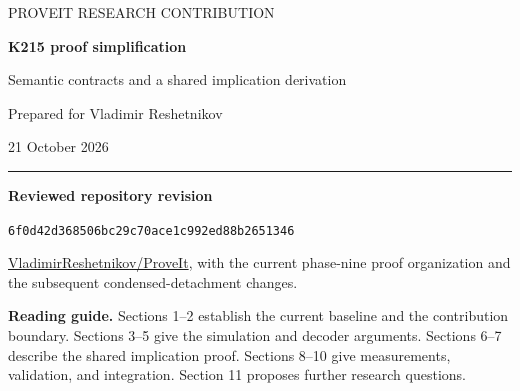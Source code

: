 \documentclass[11pt,letterpaper]{article}
\theoremstyle{definition}\newtheorem{definition}[theorem]{Definition}
\theoremstyle{remark}\newtheorem{remark}[theorem]{Remark}
\newcommand{\Baseline}{\texttt{6f0d42d368506bc29c70ace1c992ed88b2651346}}
\newcommand{\RepoURL}{https://github.com/VladimirReshetnikov/ProveIt}
\begin{document}
\begin{titlepage}
{\sffamily\small\color{ink} PROVEIT RESEARCH CONTRIBUTION\par}
\vspace{0.8in}
{\sffamily\bfseries\LARGE\color{ink} K215 proof simplification\par}
\vspace{0.15in}
{\sffamily\Large Semantic contracts and a shared implication derivation\par}
\vspace{0.35in}
{\large Prepared for Vladimir Reshetnikov\par}
{21 October 2026\par}
\vspace{0.3in}\hrule\vspace{0.2in}
\textbf{Reviewed repository revision}\par
\Baseline\par
\smallskip
\href{\RepoURL}{VladimirReshetnikov/ProveIt}, with the current phase-nine proof organization and the subsequent condensed-detachment changes.
\vspace{0.3in}
\begin{abstract}
The existing K215 correctness development already contains substantial proof compression. The next useful change is to make the generic simulation depend on precise semantic contracts, allowing the existing symbolic checker and shared decoder/primitive proofs to supply the same evidence. We supply a checked Lean implementation of this interface while preserving the original theorem signatures, and additive prefix/suffix composition modules. A concrete decrement site illustrates the composition for arbitrary register values and gaps. Separately, we port the maintained truth-free 58-step implication derivation to Rocq, generate both languages from the same derivation, and instantiate the abstract result at the existing numerical codes. The Rocq core and numerical adapter together use 15,638 bytes, against 22,673 bytes in the maintained numerical replay, a reduction of 31.0\%. The unchanged downstream calculus equivalence is checked as well. This packet provides component proofs, compatibility clients, source-bound verification records, and an adoption plan. It does not claim a rebuilt full K215 endpoint after these patches or an already measured reduction in the full site-checking workload.
\end{abstract}
\vfill
\textbf{Reading guide.} Sections 1--2 establish the current baseline and the contribution boundary. Sections 3--5 give the simulation and decoder arguments. Sections 6--7 describe the shared implication proof. Sections 8--10 give measurements, validation, and integration. Section 11 proposes further research questions.
\end{titlepage}
{\small\setlength{\parskip}{0pt}\tableofcontents}
\newpage
\end{document}
